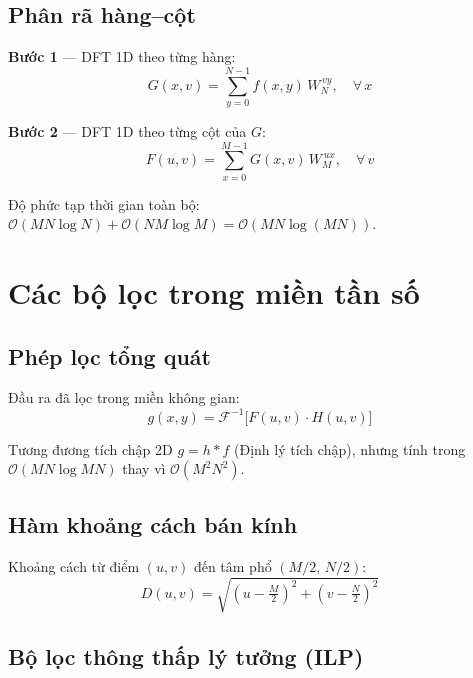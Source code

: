 \documentclass[12pt, a4paper]{article}
\begin{document}
\subsection{Phân rã hàng--cột}

\textbf{Bước 1} --- DFT 1D theo từng hàng:
\begin{equation}
  G(x,v) = \sum_{y=0}^{N-1} f(x,y)\, W_N^{\,vy}, \quad \forall\, x
  \label{eq:row_dft}
\end{equation}

\textbf{Bước 2} --- DFT 1D theo từng cột của $G$:
\begin{equation}
  F(u,v) = \sum_{x=0}^{M-1} G(x,v)\, W_M^{\,ux}, \quad \forall\, v
  \label{eq:col_dft}
\end{equation}

Độ phức tạp thời gian toàn bộ:
$\mathcal{O}(MN\log N) + \mathcal{O}(NM\log M) = \mathcal{O}(MN\log(MN))$.

\section{Các bộ lọc trong miền tần số}

\subsection{Phép lọc tổng quát}

Đầu ra đã lọc trong miền không gian:
\begin{equation}
  g(x,y) = \mathcal{F}^{-1}\!\bigl[F(u,v) \cdot H(u,v)\bigr]
  \label{eq:filter_general}
\end{equation}

Tương đương tích chập 2D $g = h * f$ (Định lý tích chập), nhưng tính
trong $\mathcal{O}(MN\log MN)$ thay vì $\mathcal{O}(M^2N^2)$.

\subsection{Hàm khoảng cách bán kính}

Khoảng cách từ điểm $(u,v)$ đến tâm phổ $(M/2,\, N/2)$:
\begin{equation}
  D(u,v) = \sqrt{\!\left(u - \tfrac{M}{2}\right)^{\!2} + \left(v - \tfrac{N}{2}\right)^{\!2}}
  \label{eq:dist}
\end{equation}

\subsection{Bộ lọc thông thấp lý tưởng (ILP)}
\end{document}
